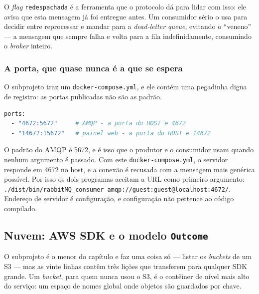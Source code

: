 O \emph{flag} \texttt{redespachada} é a ferramenta que o protocolo dá para
lidar com isso: ele avisa que esta mensagem já foi entregue antes. Um
consumidor sério o usa para decidir entre reprocessar e mandar para a
\emph{dead-letter queue}, evitando o ``veneno'' --- a mensagem que sempre falha
e volta para a fila indefinidamente, consumindo o \emph{broker} inteiro.

\subsubsection{A porta, que quase nunca é a que se espera}

O subprojeto traz um \texttt{docker-compose.yml}, e ele contém uma pegadinha
digna de registro: as portas publicadas não são as padrão.

\begin{lstlisting}[style=bt, language=bash,
    caption={Resumo de \texttt{src/rabbitmq/docker-compose.yml}: o mapeamento é
             \texttt{host:container}, e o host usa portas deslocadas.}]
ports:
  - "4672:5672"     # AMQP - a porta do HOST e 4672
  - "14672:15672"   # painel web - a porta do HOST e 14672
\end{lstlisting}

\begin{armadilha}
O padrão do AMQP é 5672, e é isso que o produtor e o consumidor usam quando
nenhum argumento é passado. Com este \texttt{docker-compose.yml}, o servidor
responde em 4672 no host, e a conexão é recusada com a mensagem mais genérica
possível. Por isso os dois programas aceitam a URL como primeiro argumento:
\texttt{./dist/bin/rabbitMQ\_consumer amqp://guest:guest@localhost:4672/}.
Endereço de servidor é configuração, e configuração não pertence ao código
compilado.
\end{armadilha}

\subsection{Nuvem: AWS SDK e o modelo \texttt{Outcome}}
\label{sec:aws}

O subprojeto  é o menor do capítulo e faz uma coisa só --- listar
os \emph{buckets} de um S3 --- mas as vinte linhas contêm três lições que
transferem para qualquer SDK grande. Um \emph{bucket}, para quem nunca usou o
S3, é o contêiner de nível mais alto do serviço: um espaço de nomes global onde
objetos são guardados por chave.

